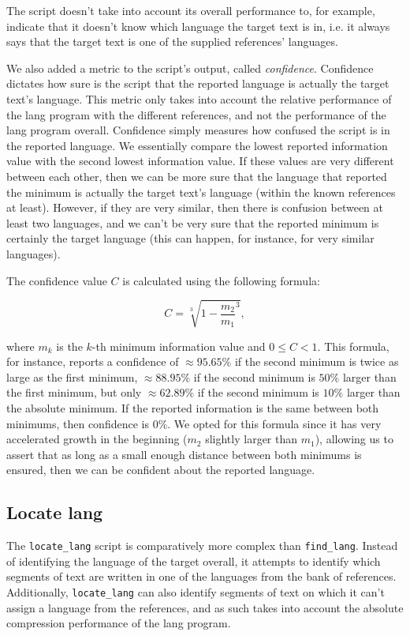 \documentclass{article}
\begin{document}
The script doesn't take into account its overall performance to, for example, indicate that it doesn't know which language the target text is in, i.e. it always says that the target text is one of the supplied references' languages.

We also added a metric to the script's output, called \textit{confidence}.
Confidence dictates how sure is the script that the reported language is actually the target text's language.
This metric only takes into account the relative performance of the lang program with the different references, and not the performance of the lang program overall.
Confidence simply measures how confused the script is in the reported language.
We essentially compare the lowest reported information value with the second lowest information value.
If these values are very different between each other, then we can be more sure that the language that reported the minimum is actually the target text's language (within the known references at least).
However, if they are very similar, then there is confusion between at least two languages, and we can't be very sure that the reported minimum is certainly the target language (this can happen, for instance, for very similar languages).

The confidence value $C$ is calculated using the following formula:

$$
C = \sqrt[3]{1 - \frac{m_2}{m_1}^3},
$$

where $m_k$ is the $k$-th minimum information value and $0 \leq C < 1$.
This formula, for instance, reports a confidence of $\approx 95.65\%$ if the second minimum is twice as large as the first minimum, $\approx 88.95\%$ if the second minimum is $50\%$ larger than the first minimum, but only $\approx 62.89\%$ if the second minimum is $10\%$ larger than the absolute minimum.
If the reported information is the same between both minimums, then confidence is $0\%$.
We opted for this formula since it has very accelerated growth in the beginning ($m_2$ slightly larger than $m_1$), allowing us to assert that as long as a small enough distance between both minimums is ensured, then we can be confident about the reported language.

\subsection{Locate lang}
\label{subsec:methodology_locate_lang}

The \verb|locate_lang| script is comparatively more complex than \verb|find_lang|.
Instead of identifying the language of the target overall, it attempts to identify which segments of text are written in one of the languages from the bank of references.
Additionally, \verb|locate_lang| can also identify segments of text on which it can't assign a language from the references, and as such takes into account the absolute compression performance of the lang program.
\end{document}
